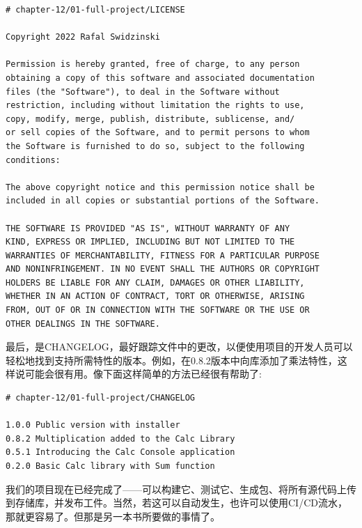 \begin{lstlisting}[style=stylePython]
# chapter-12/01-full-project/LICENSE

Copyright 2022 Rafal Swidzinski

Permission is hereby granted, free of charge, to any person
obtaining a copy of this software and associated documentation
files (the "Software"), to deal in the Software without
restriction, including without limitation the rights to use,
copy, modify, merge, publish, distribute, sublicense, and/
or sell copies of the Software, and to permit persons to whom
the Software is furnished to do so, subject to the following
conditions:

The above copyright notice and this permission notice shall be
included in all copies or substantial portions of the Software.

THE SOFTWARE IS PROVIDED "AS IS", WITHOUT WARRANTY OF ANY
KIND, EXPRESS OR IMPLIED, INCLUDING BUT NOT LIMITED TO THE
WARRANTIES OF MERCHANTABILITY, FITNESS FOR A PARTICULAR PURPOSE
AND NONINFRINGEMENT. IN NO EVENT SHALL THE AUTHORS OR COPYRIGHT
HOLDERS BE LIABLE FOR ANY CLAIM, DAMAGES OR OTHER LIABILITY,
WHETHER IN AN ACTION OF CONTRACT, TORT OR OTHERWISE, ARISING
FROM, OUT OF OR IN CONNECTION WITH THE SOFTWARE OR THE USE OR
OTHER DEALINGS IN THE SOFTWARE.
\end{lstlisting}

最后，是CHANGELOG，最好跟踪文件中的更改，以便使用项目的开发人员可以轻松地找到支持所需特性的版本。例如，在0.8.2版本中向库添加了乘法特性，这样说可能会很有用。像下面这样简单的方法已经很有帮助了:

\begin{lstlisting}[style=stylePython]
# chapter-12/01-full-project/CHANGELOG

1.0.0 Public version with installer
0.8.2 Multiplication added to the Calc Library
0.5.1 Introducing the Calc Console application
0.2.0 Basic Calc library with Sum function
\end{lstlisting}

我们的项目现在已经完成了——可以构建它、测试它、生成包、将所有源代码上传到存储库，并发布工件。当然，若这可以自动发生，也许可以使用CI/CD流水，那就更容易了。但那是另一本书所要做的事情了。












